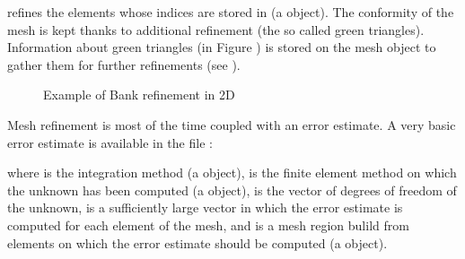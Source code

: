 \documentclass[a4paper,11pt,english]{sphinxmanual}
\begin{document}
\begin{sphinxVerbatim}[commandchars=\\\{\}]
\end{sphinxVerbatim}

refines the elements whose indices are stored in  (a  object). The
conformity of the mesh is kept thanks to additional refinement (the so called
green triangles). Information about green triangles (in Figure
{\hyperref[\detokenize{userdoc/rmesh:ud-fig-refine}]{}}) is stored on the mesh object to gather them for further
refinements (see ).

\begin{figure}[htbp]
\centering
\capstart

\noindent{}
\caption{Example of Bank refinement in 2D}\label{\detokenize{userdoc/rmesh:id3}}\label{\detokenize{userdoc/rmesh:ud-fig-refine}}\end{figure}

Mesh refinement is most of the time coupled with an  error
estimate. A very basic error estimate is available in the file
:

\begin{sphinxVerbatim}[commandchars=\\\{\}]
    
\end{sphinxVerbatim}

where  is the integration method (a  object),  is the finite
element method on which the unknown has been computed (a  object),  is
the vector of degrees of freedom of the unknown,  is a sufficiently large
vector in which the error estimate is computed for each element of the mesh, and
 is a mesh region bulild from elements on which the error estimate should be computed (a  object).
\end{document}
